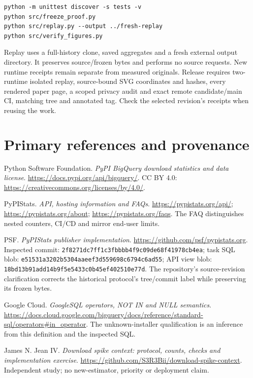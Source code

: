 \documentclass[11pt]{article}
\begin{document}
\begin{verbatim}
python -m unittest discover -s tests -v
python src/freeze_proof.py
python src/replay.py --output ../fresh-replay
python src/verify_figures.py
\end{verbatim}
Replay uses a full-history clone, saved aggregates and a fresh external output directory. It preserves source/frozen bytes and performs no source requests. New runtime receipts remain separate from measured originals. Release requires two-runtime isolated replay, source-bound SVG coordinates and hashes, every rendered paper page, a scoped privacy audit and exact remote candidate/main CI, matching tree and annotated tag. Check the selected revision's receipts when reusing the work.

\section*{Primary references and provenance}
\small
Python Software Foundation. \emph{PyPI BigQuery download statistics and data license}. \url{https://docs.pypi.org/api/bigquery/}. CC BY 4.0: \url{https://creativecommons.org/licenses/by/4.0/}.

PyPIStats. \emph{API, hosting information and FAQs}. \url{https://pypistats.org/api/}; \url{https://pypistats.org/about}; \url{https://pypistats.org/faqs}. The FAQ distinguishes nested counters, CI/CD and mirror end-user limits.

PSF. \emph{PyPIStats publisher implementation}. \url{https://github.com/psf/pypistats.org}. Inspected commit: \nolinkurl{2f8271dc7ff1c3fbbbb4f9c09de68f41978cb4ea}; task SQL blob: \nolinkurl{e51531a3202b5304aaeef3d559698c6794c6ad55}; API view blob: \nolinkurl{18bd13b91add14b9f5e5433c0b45ef402510e77d}. The repository's source-revision clarification corrects the historical protocol's tree/commit label while preserving its frozen bytes.

Google Cloud. \emph{GoogleSQL operators, NOT IN and NULL semantics}. \url{https://docs.cloud.google.com/bigquery/docs/reference/standard-sql/operators#in_operator}. The unknown-installer qualification is an inference from this definition and the inspected SQL.

James N. Jean IV. \emph{Download spike context: protocol, counts, checks and implementation exercise}. \url{https://github.com/S3R3Bii/download-spike-context}. Independent study; no new-estimator, priority or deployment claim.
\end{document}
